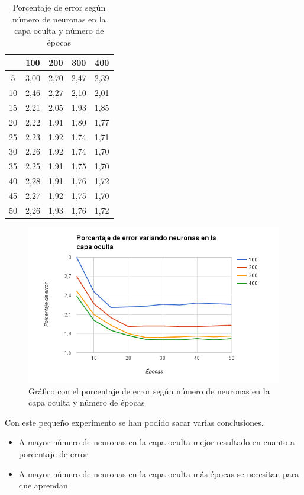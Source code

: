 \begin{table}[H]
\centering
\caption{Porcentaje de error según número de neuronas en la capa oculta y número de épocas}
\label{tab:hidden-size-and-epochs}
\begin{tabular}{| c | c | c | c | c |}
	\hline
	   & 100  & 200  & 300  & 400  \\ 
	\hline
	5  & 3,00 & 2,70 & 2,47 & 2,39 \\
	10 & 2,46 & 2,27 & 2,10 & 2,01 \\
	15 & 2,21 & 2,05 & 1,93 & 1,85 \\
	20 & 2,22 & 1,91 & 1,80 & 1,77 \\
	25 & 2,23 & 1,92 & 1,74 & 1,71 \\
	30 & 2,26 & 1,92 & 1,74 & 1,70 \\
	35 & 2,25 & 1,91 & 1,75 & 1,70 \\
	40 & 2,28 & 1,91 & 1,76 & 1,72 \\
	45 & 2,27 & 1,92 & 1,75 & 1,70 \\
	50 & 2,26 & 1,93 & 1,76 & 1,72 \\ 
	\hline
\end{tabular}
\end{table}

\begin{figure}[H]
	\centering
	\includegraphics[width=14cm]{img/hidden-size-and-epochs}
	\caption{Gráfico con el porcentaje de error según número de neuronas en la capa oculta y número de épocas}
	\label{fig:hidden-size-and-epochs}
\end{figure}

Con este pequeño experimento se han podido sacar varias conclusiones. 
\begin{itemize}
	\item A mayor número de neuronas en la capa oculta mejor resultado en cuanto a porcentaje de error
	\item A mayor número de neuronas en la capa oculta más épocas se necesitan para que aprendan
\end{itemize}

